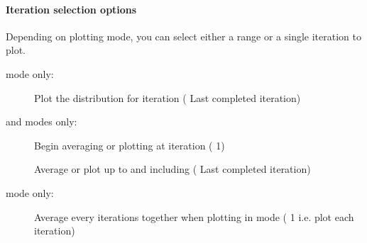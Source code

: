 \documentclass[letterpaper,10pt,english]{sphinxmanual}
\begin{document}
\paragraph{Iteration selection options}
\label{\detokenize{users_guide/command_line_tools/plothist:iteration-selection-options}}
Depending on plotting mode, you can select either a range or a single
iteration to plot.

 mode only:
\begin{description}
\item[{}] \leavevmode
Plot the distribution for iteration  (
Last completed iteration)

\end{description}

 and  modes only:
\begin{description}
\item[{}] \leavevmode
Begin averaging or plotting at iteration 
( 1)

\item[{}] \leavevmode
Average or plot up to and including  (
Last completed iteration)

\end{description}

 mode only:
\begin{description}
\item[{}] \leavevmode
Average every  iterations together when plotting in
 mode ( 1 \sphinxhyphen{} i.e. plot each iteration)

\end{description}
\end{document}
